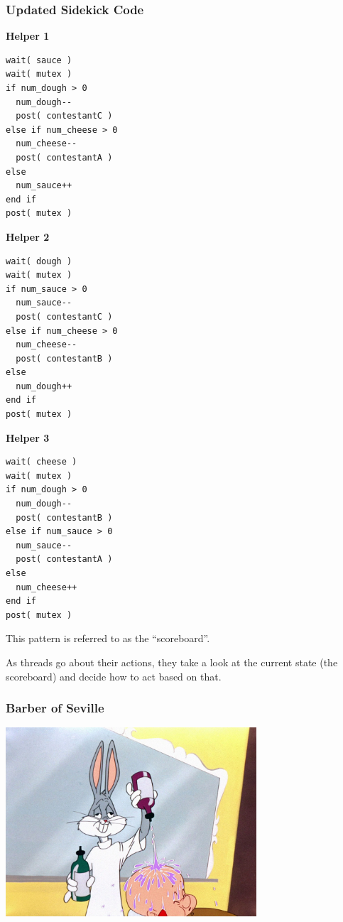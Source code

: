 \begin{frame}[fragile]
\frametitle{Updated Sidekick Code}

\begin{multicols}{3}
\textbf{Helper 1}
\begin{lstlisting}
wait( sauce )
wait( mutex )
if num_dough > 0  
  num_dough--
  post( contestantC )
else if num_cheese > 0
  num_cheese--
  post( contestantA )
else
  num_sauce++
end if  
post( mutex )
\end{lstlisting}
\columnbreak
\textbf{Helper 2}
\begin{lstlisting}
wait( dough )
wait( mutex )
if num_sauce > 0  
  num_sauce--
  post( contestantC )
else if num_cheese > 0
  num_cheese--
  post( contestantB )
else
  num_dough++
end if  
post( mutex )
\end{lstlisting}
\columnbreak
\textbf{Helper 3}
\begin{lstlisting}
wait( cheese )
wait( mutex )
if num_dough > 0 
  num_dough--
  post( contestantB )
else if num_sauce > 0
  num_sauce--
  post( contestantA )
else
  num_cheese++
end if  
post( mutex )
\end{lstlisting}
\end{multicols}

This pattern is referred to as the ``scoreboard''.

As threads go about their actions, they take a look at the current state (the scoreboard) and decide how to act based on that.

\end{frame}

\begin{frame}
\frametitle{Barber of Seville}

\begin{center}
	\includegraphics[width=0.7\textwidth]{images/rabbitofseville.jpg}
\end{center}

\end{frame}

